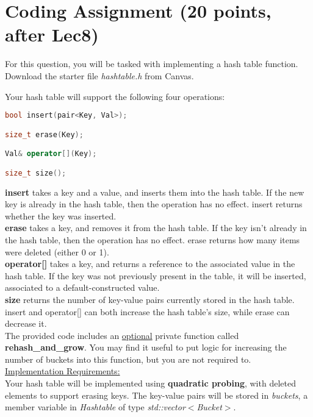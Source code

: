 \documentclass[11pt]{exam}
\begin{document}
\section{Coding Assignment (20 points, after Lec8)}
For this question, you will be tasked with implementing a hash table function. Download the starter file \textit{hashtable.h} from Canvas.

Your hash table will support the following four operations:
\begin{lstlisting}[language=c++]
bool insert(pair<Key, Val>);

size_t erase(Key);

Val& operator[](Key);

size_t size();
\end{lstlisting}
\textbf{insert} takes a key and a value, and inserts them into the hash table. If the new key is already in the hash table, then the operation has no effect. insert returns whether the key was inserted.\\

\textbf{erase} takes a key, and removes it from the hash table. If the key isn’t already in the hash table, then the operation has no effect. erase returns how many items were deleted (either 0 or 1).\\

\textbf{operator[]} takes a key, and returns a reference to the associated value in the hash table. If the key was not previously present in the table, it will be inserted, associated to a default-constructed value.\\

\textbf{size} returns the number of key-value pairs currently stored in the hash table. insert and operator[] can both increase the hash table’s size, while erase can decrease it.\\

The provided code includes an \underline{optional} private function called \textbf{rehash\_and\_grow}. You may find it useful to put logic for increasing the number of buckets into this function, but you are not required to.\\

\underline{Implementation Requirements:}\\

Your hash table will be implemented using \textbf{quadratic probing}, with deleted elements to support erasing keys. The key-value pairs will be stored in \textit{buckets}, a member variable in \textit{Hashtable} of type \textit{std::vector$<$Bucket$>$}.
\end{document}
